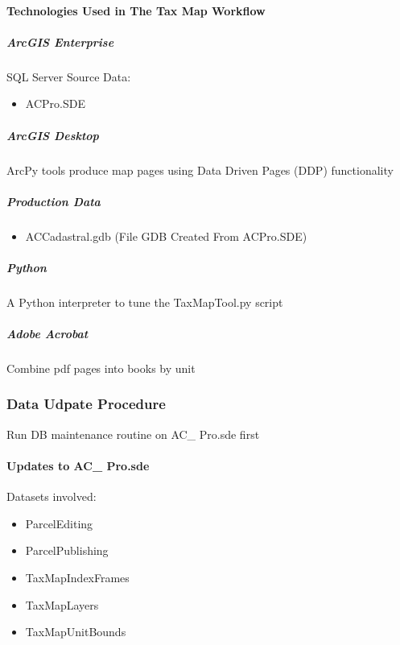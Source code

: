 \paragraph{Technologies Used in The Tax Map Workflow}
\begin{adjmulticols}{2}{\innerMar}{\outerMar}
\subparagraph{ArcGIS Enterprise}
SQL Server Source Data:
\begin{itemize}
\item ACPro.SDE
\end{itemize}
\subparagraph{ArcGIS Desktop}\noindent ArcPy tools produce map pages using Data Driven Pages (DDP) functionality
\subparagraph{Production Data}
\begin{itemize}
\item ACCadastral.gdb {\tiny (File GDB Created From ACPro.SDE)}
\end{itemize}
\subparagraph{Python}\noindent A Python interpreter to tune the TaxMapTool.py script


\subparagraph{Adobe Acrobat}\noindent Combine pdf pages into books by unit
\end{adjmulticols}



\clearpage
\subsubsection{Data Udpate Procedure}
Run DB maintenance routine on AC\_ Pro.sde first

\paragraph{Updates to AC\_ Pro.sde}
Datasets involved:

\begin{itemize}
\item ParcelEditing
\item ParcelPublishing
\item TaxMapIndexFrames
\item TaxMapLayers
\item TaxMapUnitBounds
\end{itemize}
\clearpage

